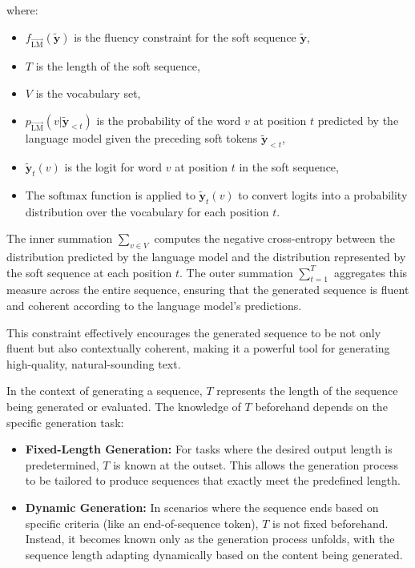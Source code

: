 \documentclass{article}
\begin{document}
where:
\begin{itemize}
    \item \(f_{\overrightarrow{\text{LM}}}(\mathbf{\tilde{y}})\) is the fluency constraint for the soft sequence \(\mathbf{\tilde{y}}\),
    \item \(T\) is the length of the soft sequence,
    \item \(V\) is the vocabulary set,
    \item \(p_{\overrightarrow{\text{LM}}}(v|\mathbf{\tilde{y}}_{<t})\) is the probability of the word \(v\) at position \(t\) predicted by the language model given the preceding soft tokens \(\mathbf{\tilde{y}}_{<t}\),
    \item \(\mathbf{\tilde{y}}_t(v)\) is the logit for word \(v\) at position \(t\) in the soft sequence,
    \item The \(\text{softmax}\) function is applied to \(\mathbf{\tilde{y}}_t(v)\) to convert logits into a probability distribution over the vocabulary for each position \(t\).
\end{itemize}


The inner summation \(\sum_{v \in V}\) computes the negative cross-entropy between the distribution predicted by the language model and the distribution represented by the soft sequence at each position \(t\). The outer summation \(\sum_{t=1}^{T}\) aggregates this measure across the entire sequence, ensuring that the generated sequence is fluent and coherent according to the language model's predictions.

This constraint effectively encourages the generated sequence to be not only fluent but also contextually coherent, making it a powerful tool for generating high-quality, natural-sounding text.

In the context of generating a sequence, \(T\) represents the length of the sequence being generated or evaluated. The knowledge of \(T\) beforehand depends on the specific generation task:

\begin{itemize}
    \item \textbf{Fixed-Length Generation:} For tasks where the desired output length is predetermined, \(T\) is known at the outset. This allows the generation process to be tailored to produce sequences that exactly meet the predefined length.

    \item \textbf{Dynamic Generation:} In scenarios where the sequence ends based on specific criteria (like an end-of-sequence token), \(T\) is not fixed beforehand. Instead, it becomes known only as the generation process unfolds, with the sequence length adapting dynamically based on the content being generated.
\end{itemize}
\end{document}
